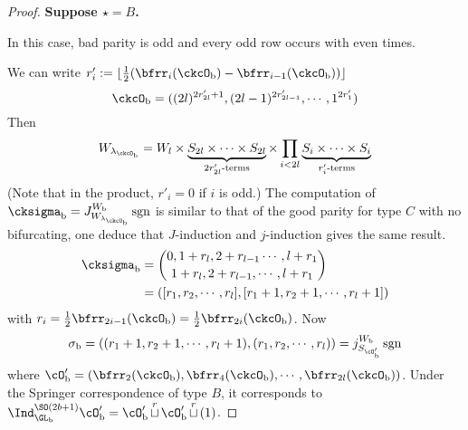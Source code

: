 \documentclass[12pt,a4paper]{amsart}
\newcommand{\sgn}{\operatorname{sgn}}
\numberwithin{equation}{section}
\theoremstyle{remark}
\def\half{{\tfrac{1}{2}}}
\def\floor#1{{\lfloor #1 \rfloor}}
\def\lamckb{\lambda_{\ckcO_{\mathrm b}}}
\def\cuprow{{\stackrel{r}{\sqcup}}}
\def\cuprow{{\,\stackrel{r}{\sqcup}\,}}
\begin{document}
\begin{proof}
{{      {\bf Suppose $\star=B$. }

      In this case, bad parity is odd and every odd row occurs with even
      times.

      We can write
      $r'_{i} := \floor{\half(\bfrr_{i}(\ckcO_{\mathrm b})-\bfrr_{i-1}(\ckcO_{\mathrm b}))}$
      \[
        \ckcO_{\mathrm b} %
        = ((2l)^{2r'_{2l}+1}, (2l-1)^{2r'_{2l-1}},\cdots, 1^{2r'_{1}})
      \]
      Then
      \[
        W_{\lamckb} = W_{l} \times \underbrace{S_{2l}\times \cdots \times S_{2l}}_{2r'_{2l}\text{-terms}} \times \prod_{i<2l} \underbrace{S_{i}\times \cdots\times S_{i}}_{r'_{i}\text{-terms}}
      \]
      (Note that in the product, $r'_{i}=0$ if $i$ is odd.) The computation of
      $\cksigma_{\mathrm b} = J_{W_{\lamckb}}^{W_{\mathrm b}} \sgn$ is similar to that of the
      good parity for type $C$ with no bifurcating, one deduce that
      $J$-induction and $j$-induction gives the same result.
      \[
        \begin{split}
          \cksigma_{\mathrm b} &=
          \binom{0, 1+r_{l}, 2+r_{l-1}\cdots, l+r_{1}}{1+r_{l},2+r_{l-1}, \cdots, l+r_{1}}\\
          & = ([r_{1},r_{2},\cdots, r_{l}],[r_{1}+1,r_{2}+1,\cdots,r_{l}+1])\\
        \end{split}
      \]
      with $r_{i} = \half\bfrr_{2i-1}(\ckcO_{\mathrm b}) = \half\bfrr_{2i}(\ckcO_{\mathrm b})$.
      Now
      \[
        \sigma_{\mathrm b} = ((r_{1}+1,r_{2}+1,\cdots,r_{l}+1), (r_{1},r_{2},\cdots, r_{l})) = j_{S_{\cO'_{\mathrm b}}}^{W_{\mathrm b}}\sgn
      \]
      where
      $\cO'_{\mathrm b}=(\bfrr_{2}(\ckcO_{\mathrm b}),\bfrr_{4}(\ckcO_{\mathrm b}),\cdots, \bfrr_{2l}(\ckcO_{\mathrm b}))$.
      Under the Springer correspondence of type $B$, it corresponds to
      $\Ind_{\GL_{\mathrm b}}^{\SO(2b+1)}\cO'_{\mathrm b} = \cO'_{\mathrm b}\cuprow \cO'_{\mathrm b}\cuprow (1)$.



}}
\end{proof}
\end{document}
